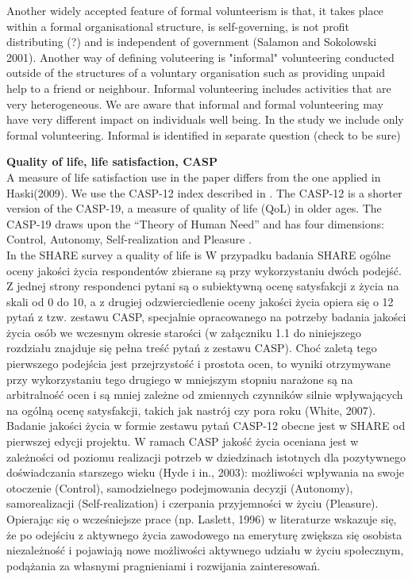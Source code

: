 \documentclass[10pt, letterpaper]{article}
\begin{document}
\begin{spacing}{1.4}
Another widely accepted feature of formal volunteerism is that, it takes place within a formal organisational structure, is self-governing, is not profit distributing (?) and is independent of government (Salamon and Sokolowski 2001). Another way of defining voluteering is "informal" volunteering conducted outside of the structures of a voluntary organisation such as providing unpaid help to a friend or neighbour. Informal volunteering includes activities that are very heterogeneous. We are aware that informal and formal volunteering may have very different impact on individuals well being. In the study we include only formal volunteering. Informal is identified in separate question (check to be sure)

\textbf{Quality of life, life satisfaction, CASP} \\
A measure of life satisfaction use in the paper differs from the one applied in Haski(2009). We use the CASP-12 index described in \cite{hyde03}. The CASP-12 is a shorter version of the CASP-19, a measure of quality of life (QoL) in older ages. The CASP-19 draws upon the “Theory of Human Need” and has four dimensions: Control, Autonomy, Self-realization and Pleasure \citep{borrat15}.\\

In the SHARE survey a quality of life is W przypadku badania SHARE ogólne oceny jakości życia respondentów zbierane są przy wykorzystaniu dwóch podejść. Z jednej strony respondenci pytani są o subiektywną ocenę satysfakcji z życia na skali od 0 do 10, a z drugiej odzwierciedlenie oceny jakości życia opiera się o 12 pytań z tzw. zestawu CASP, specjalnie opracowanego na potrzeby badania jakości życia osób we wczesnym okresie starości (w załączniku 1.1 do niniejszego rozdziału znajduje się pełna treść pytań z zestawu CASP). Choć zaletą tego pierwszego podejścia jest przejrzystość i prostota ocen, to wyniki otrzymywane przy wykorzystaniu tego drugiego w mniejszym stopniu narażone są na arbitralność ocen i są mniej zależne od zmiennych czynników silnie wpływających na ogólną ocenę satysfakcji, takich jak nastrój czy pora roku (White, 2007). 
Badanie jakości życia w formie zestawu pytań CASP-12 obecne jest w SHARE od pierwszej edycji projektu. W ramach CASP jakość życia oceniana jest w zależności od poziomu realizacji potrzeb w dziedzinach istotnych dla pozytywnego doświadczania starszego wieku (Hyde i in., 2003): możliwości wpływania na swoje otoczenie (Control), samodzielnego podejmowania decyzji (Autonomy), samorealizacji (Self-realization) i czerpania przyjemności w życiu (Pleasure).  Opierając się o wcześniejsze prace (np. Laslett, 1996) w literaturze wskazuje się, że po odejściu z aktywnego życia zawodowego na emeryturę zwiększa się osobista niezależność i pojawiają nowe możliwości aktywnego udziału w życiu społecznym, podążania za własnymi pragnieniami i rozwijania zainteresowań. 


\end{spacing}
\end{document}
